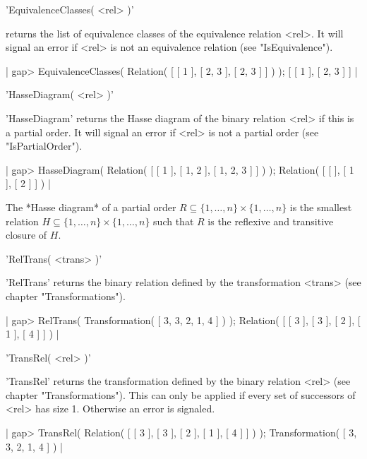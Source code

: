 
'EquivalenceClasses( <rel> )'

returns  the  list of equivalence  classes   of the equivalence  relation
<rel>.  It  will signal an error if  <rel> is not an equivalence relation
(see "IsEquivalence").

|    gap> EquivalenceClasses( Relation( [ [ 1 ], [ 2, 3 ], [ 2, 3 ] ] ) );
    [ [ 1 ], [ 2, 3 ] ] |


'HasseDiagram( <rel> )'

'HasseDiagram' returns the Hasse diagram  of the binary relation <rel> if
this  is a partial  order.  It will   signal an error  if <rel>  is not a
partial order (see "IsPartialOrder").

|    gap> HasseDiagram( Relation( [ [ 1 ], [ 1, 2 ], [ 1, 2, 3 ] ] ) );      
    Relation( [ [  ], [ 1 ], [ 2 ] ] ) |

The *Hasse  diagram* of  a partial  order $R  \subseteq \{1,  \dots,  n\}
\times \{1, \dots, n\}$ is the smallest relation $H \subseteq \{1, \dots,
n\} \times \{1, \dots, n\}$ such that $R$ is the reflexive and transitive
closure of $H$.

%

'RelTrans( <trans> )'

'RelTrans' returns the binary  relation   defined by the   transformation
<trans> (see chapter "Transformations").

|    gap> RelTrans( Transformation( [ 3, 3, 2, 1, 4 ] ) );
    Relation( [ [ 3 ], [ 3 ], [ 2 ], [ 1 ], [ 4 ] ] ) |

%

'TransRel( <rel> )'

'TransRel'   returns the  transformation  defined by  the binary relation
<rel> (see chapter "Transformations").  This can only be applied if every
set of successors of <rel> has size 1.  Otherwise an error is signaled.

|    gap> TransRel( Relation( [ [ 3 ], [ 3 ], [ 2 ], [ 1 ], [ 4 ] ] ) );
    Transformation( [ 3, 3, 2, 1, 4 ] ) |

